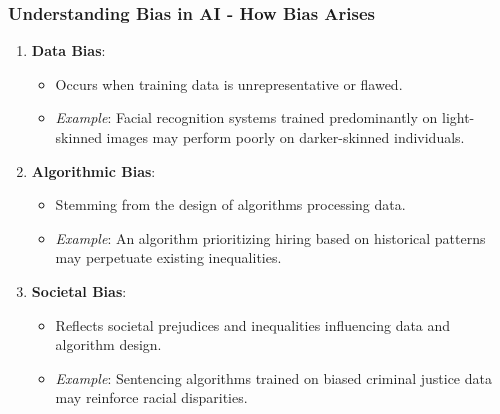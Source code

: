 \documentclass{beamer}
\begin{document}
\begin{frame}[fragile]
    \frametitle{Understanding Bias in AI - How Bias Arises}
    \begin{enumerate}
        \item \textbf{Data Bias}:
        \begin{itemize}
            \item Occurs when training data is unrepresentative or flawed.
            \item \textit{Example}: Facial recognition systems trained predominantly on light-skinned images may perform poorly on darker-skinned individuals.
        \end{itemize}
        
        \item \textbf{Algorithmic Bias}:
        \begin{itemize}
            \item Stemming from the design of algorithms processing data.
            \item \textit{Example}: An algorithm prioritizing hiring based on historical patterns may perpetuate existing inequalities.
        \end{itemize}
        
        \item \textbf{Societal Bias}:
        \begin{itemize}
            \item Reflects societal prejudices and inequalities influencing data and algorithm design.
            \item \textit{Example}: Sentencing algorithms trained on biased criminal justice data may reinforce racial disparities.
        \end{itemize}
    \end{enumerate}
\end{frame}
\end{document}
